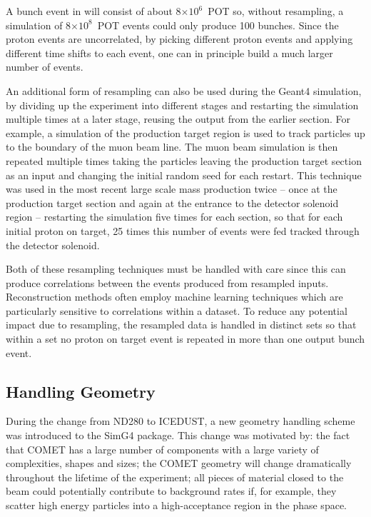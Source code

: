 A bunch event in \phaseI will consist of about 8$\times10^{6}$~POT so, without resampling, a simulation of 8$\times10^{8}$~POT events could only produce 100 bunches.
Since the proton events are uncorrelated, by picking different proton events and applying different time shifts to each event, one can in principle build a much larger number of events.

An additional form of resampling can also be used during the Geant4 simulation, by dividing up the experiment into different stages and restarting the simulation multiple times at a later stage, reusing the output from the earlier section.
For example, a simulation of the production target region is used to track particles up to the boundary of the muon beam line.
The muon beam simulation is then repeated multiple times taking the particles leaving the production target section as an input and changing the initial random seed for each restart.
This technique was used in the most recent large scale mass production twice -- once at the production target section and again at the entrance to the detector solenoid region -- restarting the simulation five times for each section, so that for each initial proton on target, 25 times this number of events were fed tracked through the detector solenoid.

Both of these resampling techniques must be handled with care since this can produce correlations between the events produced from resampled inputs.
Reconstruction methods often employ machine learning techniques which are particularly sensitive to correlations within a dataset.
To reduce any potential impact due to resampling, the resampled data is handled in distinct sets so that within a set no proton on target event is repeated in more than one output bunch event.

\subsection{Handling Geometry}
During the change from ND280 to ICEDUST, a new geometry handling scheme was introduced to the SimG4 package.
This change was motivated by: 
    the fact that COMET has a large number of components with a large variety of complexities, shapes and sizes;
    the COMET geometry will change dramatically throughout the lifetime of the experiment;
    all pieces of material closed to the beam could potentially contribute to background rates if, for example, they scatter high energy particles into a high-acceptance region in the phase space.

